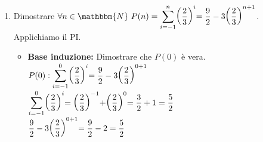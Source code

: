 \documentclass[12pt, letterpaper]{report}
\begin{document}
\begin{enumerate}
\begin{itemize}
  				\item \textbf{Base induzione:} Dimostrare che $P(0)$ è vera. \\
  				$P(0): \mathlarger{\frac{1}{2}\sum_{i = 0}^{0}3^i} = \mathlarger{\frac{3^{0 + 1} - 1}{4}}$ \\
  				$\mathlarger{\frac{1}{2}\sum_{i = 0}^{0}3^i = \frac{1}{2} \cdot 3^0 = \frac{1}{2}}$ \\
  				$\mathlarger{\frac{3^{0 + 1} - 1}{4} = \frac{3 - 1}{4} = \frac{1}{2}}$ \\
  				Sono uguali quindi $P(0)$ vera.
  				\item \textbf{Passo induttivo:} Dimostrare che $\forall n \in \mathbbm{N} \ P(n)$ vera $\Rightarrow P(k + 1)$ vera. \\
  				$P(k) = \mathlarger{\frac{1}{2}\sum_{i = 0}^{k}3^i = \frac{3^{k + 1} - 1}{4}}$ vera\\
  				$P(k+1) = \mathlarger{\frac{1}{2}\sum_{i = 0}^{k+1}3^i = \frac{3^{k + 2} - 1}{4}}$ da dimostrare.\\
  				$\mathlarger{\frac{1}{2}\sum_{i = 0}^{k+1}3^i} = \mathlarger{\frac{1}{2}\sum_{i=0}^{k}3^i + \frac{1}{2}3^{k + 1}} = \mathlarger{\frac{3^{k+1} - 1}{4} + \frac{1}{2}3^{k + 1}} = \mathlarger{\frac{3^{k + 1} - 1 + 2 \cdot 3^{k + 1}}{4}} = \mathlarger{\frac{3 \cdot 3^{k + 1} - 1}{4}} = \mathlarger{\frac{3^{k + 2} - 1}{4}}$. \\ \\
  				$\Rightarrow P(k + 1)$ vera. \\
  				$\Rightarrow P(n)$ vera $\forall n \in \mathbbm{N}$.
  			\end{itemize}
  			\item Dimostrare $\forall n \in \mathbbm{N} \ P(n) = \mathlarger{\sum_{i = -1}^{n}\biggl(\frac{2}{3}\biggl)^i = \frac{9}{2} - 3\biggl(\frac{2}{3}\biggl)^{n+1}}$. \\
  			Applichiamo il PI.
  			\begin{itemize}
  				\item \textbf{Base induzione:} Dimostrare che $P(0)$ è vera. \\
  				$P(0): \mathlarger{\sum_{i = -1}^{0}\biggl(\frac{2}{3}\biggl)^i = \frac{9}{2} - 3\biggl(\frac{2}{3}\biggl)^{0+1}}$ \\
  				$\mathlarger{\sum_{i = -1}^{0}\biggl(\frac{2}{3}\biggl)^i = \biggl(\frac{2}{3}\biggl)^{-1} + \biggl(\frac{2}{3}\biggl)^0 = \frac{3}{2} + 1 = \frac{5}{2}}$ \\
  				$\mathlarger{\frac{9}{2} - 3\biggl(\frac{2}{3}\biggl)^{0+1} = \frac{9}{2} - 2 = \frac{5}{2}}$ \\

\end{itemize}
\end{enumerate}
\end{document}
